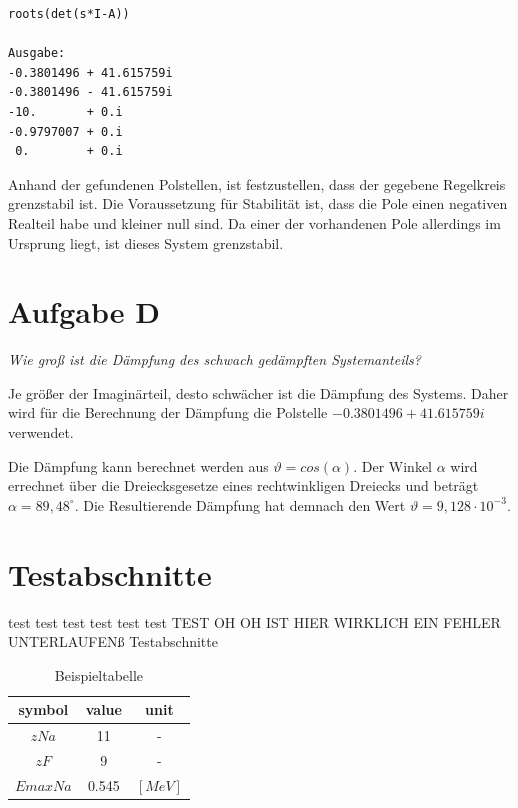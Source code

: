 \begin{lstlisting}[caption = Pole der Regelstrecke, captionpos = b, label = lst:example]
roots(det(s*I-A))
    
Ausgabe:
-0.3801496 + 41.615759i
-0.3801496 - 41.615759i
-10.       + 0.i       
-0.9797007 + 0.i       
 0.        + 0.i  \end{lstlisting}
Anhand der gefundenen Polstellen, ist festzustellen, dass der gegebene Regelkreis grenzstabil ist. Die Voraussetzung für Stabilität ist, dass die Pole einen negativen Realteil habe und kleiner null sind. Da einer der vorhandenen Pole allerdings im Ursprung liegt, ist dieses System grenzstabil.

\section{Aufgabe D}
\textit{Wie groß ist die Dämpfung des schwach gedämpften Systemanteils?}

\noindent Je größer der Imaginärteil, desto schwächer ist die Dämpfung des Systems. Daher wird für die Berechnung der Dämpfung die Polstelle $-0.3801496 + 41.615759i$ verwendet. 

Die Dämpfung kann berechnet werden aus $\vartheta = cos(\alpha)$. Der Winkel $\alpha$ wird errechnet über die Dreiecksgesetze eines rechtwinkligen Dreiecks und beträgt $\alpha = 89,48^\circ$. Die Resultierende Dämpfung hat demnach den Wert $\vartheta =9,128\cdot10^{-3} $. 
\section{Testabschnitte} 
test test test test test test TEST OH OH IST HIER WIRKLICH EIN FEHLER UNTERLAUFENß Testabschnitte 


\begin{table}[!ht]
    \centering
        \begin{tabular}{ | c | c | c | }
            \hline
            symbol & value & unit \\ \hline            
            $z Na$ & 11 & - \\ \hline      
            $z F$ & 9 & - \\ \hline      
            $Emax Na$ & 0.545 & $[MeV]$ \\ \hline
        \end{tabular}
        \caption{Beispieltabelle \cite{pgfplots}} 
        \label{tab:example} %
    \end{table}

